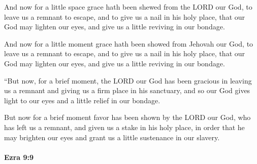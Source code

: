 			And now for a little space grace hath been shewed from the LORD our God, to leave us a remnant to escape, and to give us a nail in his holy place, that our God may lighten our eyes, and give us a little reviving in our bondage.

			\begin{versebox}
					\item[BHS] 
					\item[LXX] 
					\item[ASV] And now for a little moment grace hath been showed from Jehovah our God, to leave us a remnant to escape, and to give us a nail in his holy place, that our God may lighten our eyes, and give us a little reviving in our bondage.
					\item[NIV] “But now, for a brief moment, the LORD our God has been gracious in leaving us a remnant and giving us a firm place in his sanctuary, and so our God gives light to our eyes and a little relief in our bondage.
					\item[NRSV] But now for a brief moment favor has been shown by the LORD our God, who has left us a remnant, and given us a stake in his holy place, in order that he may brighten our eyes and grant us a little sustenance in our slavery.
			\end{versebox}

		\paragraph{Ezra 9:9} %
			\label{EZRA-9-9}


